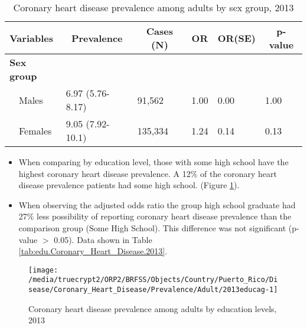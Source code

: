 \begin{table}[H]
\caption{Coronary heart disease prevalence  among adults by sex group, 2013\label{tab:sex.Coronary_Heart_Disease.2013}} 
\begin{center}
\begin{tabular}{llllll}
\hline\hline
\multicolumn{1}{l}{Variables}&\multicolumn{1}{c}{Prevalence}&\multicolumn{1}{c}{Cases (N)}&\multicolumn{1}{c}{OR}&\multicolumn{1}{c}{OR(SE)}&\multicolumn{1}{c}{p-value}\tabularnewline
\hline
{\bfseries Sex group}&&&&&\tabularnewline
~~Males&6.97 (5.76-8.17)& 91,562&1.00&0.00&1.00\tabularnewline
~~Females&9.05 (7.92-10.1)&135,334&1.24&0.14&0.13\tabularnewline
\hline
\end{tabular}\end{center}

\end{table}


\newpage
\begin{itemize}

\item When comparing by education level, those with
some high school
have the highest coronary heart disease prevalence. A 12\% of the coronary heart disease prevalence patients had some high school.
(Figure \ref{fig:edu.Coronary_Heart_Disease.2013}).

\item 
When observing the adjusted odds ratio the group high school graduate had 27\% less possibility of reporting coronary heart disease prevalence than the comparison group (Some High School).
This difference was not significant (p-value $>$ 0.05).  Data shown in Table \ref{tab:edu.Coronary_Heart_Disease.2013}.

\end{itemize}

\begin{figure}[H]
\caption{Coronary heart disease prevalence among adults by education levels, 
         2013}
\begin{knitrout}
\color{fgcolor}

{\centering \texttt{[image: /media/truecrypt2/ORP2/BRFSS/Objects/Country/Puerto\_Rico/Disease/Coronary\_Heart\_Disease/Prevalence/Adult/2013educag-1]} 

}



\end{knitrout}
 \label{fig:edu.Coronary_Heart_Disease.2013}
\end{figure}

